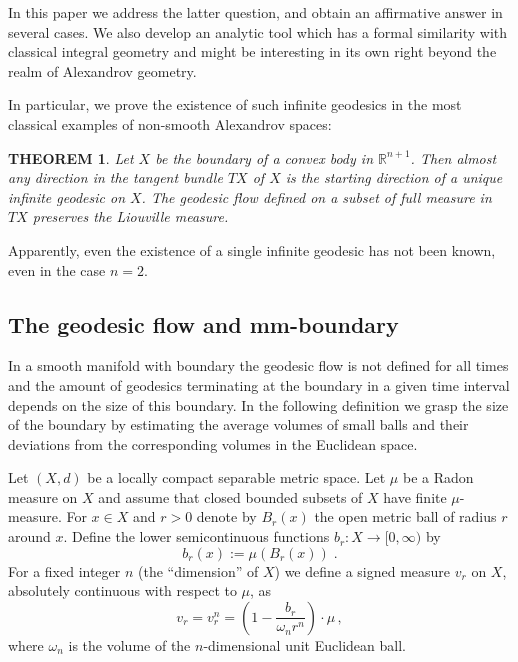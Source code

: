 \documentclass[12pt,leqno,intlimits]{amsart}
\numberwithin{equation}{section}
\newtheorem{thm}{THEOREM}[section]
\theoremstyle{definition}
\theoremstyle{remark}
\begin{document}
In this paper we address the latter question, and obtain an affirmative answer in several cases.
We also develop an analytic tool which has a formal similarity with  classical integral geometry
and might  be interesting in its own right beyond the realm of Alexandrov geometry.

In particular, we prove the existence of such  infinite geodesics in the most classical examples of non-smooth Alexandrov spaces:

\begin{thm} \label{thmfirst}
Let $X$ be the boundary of a convex body in $\mathbb R^{n+1}$.
Then almost any direction in the tangent bundle $TX$ of $X$
is the starting direction of a unique  infinite geodesic on $X$.
The geodesic flow defined on a subset  of full  measure in $TX$ preserves the Liouville measure.
\end{thm}

Apparently, even the existence of a single infinite geodesic has not been known,  even in the case $n=2$.


 \subsection{The geodesic flow and mm-boundary}
In a smooth manifold with boundary the geodesic flow is not defined for all times and the amount of geodesics terminating at the boundary in a given time interval depends on the size  of this boundary.
In the following definition we grasp the size of the boundary by estimating the average volumes of small balls and their deviations from the corresponding  volumes in the Euclidean space.

Let $(X,d)$ be a locally compact separable metric space. Let $\mu$ be   a  Radon  measure on $X$ and assume that closed bounded subsets
of $X$ have finite $\mu$-measure.
For $x\in X$ and $r>0$
denote by $B_r (x)$ the open metric ball of radius $r$ around  $x$. Define the lower semicontinuous functions $b_r:X\to [0,\infty )$ by
\begin{equation}
 b_r(x):=\mu (B_r (x)) \; .
 \end{equation}
For a fixed integer $n$ (the ``dimension'' of $X$)
 we define a signed measure $v_r$ on $X$, absolutely continuous with respect to $\mu$,   as
\begin{equation} \label{eq:first}
 v_r=v^n_r = (1 - \frac {b_r} { \omega _n r^n} )\cdot \mu \, ,
\end{equation}
where $\omega _n$ is the volume of the $n$-dimensional unit Euclidean ball.
\end{document}
